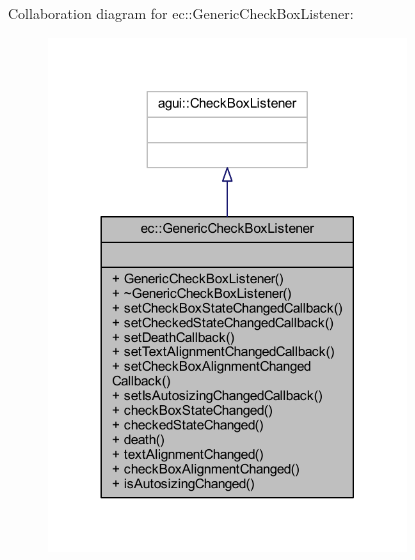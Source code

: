 Collaboration diagram for ec\+:\+:Generic\+Check\+Box\+Listener\+:\nopagebreak
\begin{figure}[H]
\begin{center}
\leavevmode
\includegraphics[width=269pt]{classec_1_1_generic_check_box_listener__coll__graph}
\end{center}
\end{figure}
